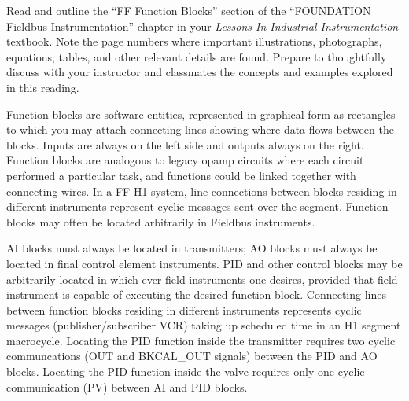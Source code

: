 

Read and outline the ``FF Function Blocks'' section of the ``FOUNDATION Fieldbus Instrumentation'' chapter in your {\it Lessons In Industrial Instrumentation} textbook.  Note the page numbers where important illustrations, photographs, equations, tables, and other relevant details are found.  Prepare to thoughtfully discuss with your instructor and classmates the concepts and examples explored in this reading.














Function blocks are software entities, represented in graphical form as rectangles to which you may attach connecting lines showing where data flows between the blocks.  Inputs are always on the left side and outputs always on the right.  Function blocks are analogous to legacy opamp circuits where each circuit performed a particular task, and functions could be linked together with connecting wires.  In a FF H1 system, line connections between blocks residing in different instruments represent cyclic messages sent over the segment.  Function blocks may often be located arbitrarily in Fieldbus instruments.

AI blocks must always be located in transmitters; AO blocks must always be located in final control element instruments.  PID and other control blocks may be arbitrarily located in which ever field instruments one desires, provided that field instrument is capable of executing the desired function block.  Connecting lines between function blocks residing in different instruments represents cyclic messages (publisher/subscriber VCR) taking up scheduled time in an H1 segment macrocycle.  Locating the PID function inside the transmitter requires two cyclic communcations (OUT and BKCAL\_OUT signals) between the PID and AO blocks.  Locating the PID function inside the valve requires only one cyclic communication (PV) between AI and PID blocks.

\vskip 10pt

